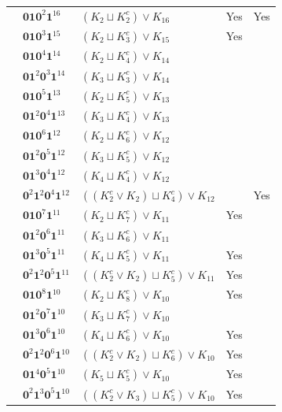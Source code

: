 \documentclass[preprint]{elsarticle}
\begin{document}
\begin{center}
\begin{longtable}{p{0.7cm} p{2cm} p{4cm} p{1cm} p{0cm}}
&$\mathbf{0} \mathbf{1} \mathbf{0}^2 \mathbf{1}^{16}$ & $ (K_{2} \sqcup K_{2}^c) \vee K_{16}$ &Yes &Yes\\
&$\mathbf{0} \mathbf{1} \mathbf{0}^3 \mathbf{1}^{15}$ & $ (K_{2} \sqcup K_{3}^c) \vee K_{15}$ &Yes &\\
&$\mathbf{0} \mathbf{1} \mathbf{0}^4 \mathbf{1}^{14}$ & $ (K_{2} \sqcup K_{4}^c) \vee K_{14}$ & &\\
&$\mathbf{0} \mathbf{1}^{2} \mathbf{0}^3 \mathbf{1}^{14}$ & $ (K_{3} \sqcup K_{3}^c) \vee K_{14}$ & &\\
&$\mathbf{0} \mathbf{1} \mathbf{0}^5 \mathbf{1}^{13}$ & $ (K_{2} \sqcup K_{5}^c) \vee K_{13}$ & &\\
&$\mathbf{0} \mathbf{1}^{2} \mathbf{0}^4 \mathbf{1}^{13}$ & $ (K_{3} \sqcup K_{4}^c) \vee K_{13}$ & &\\
&$\mathbf{0} \mathbf{1} \mathbf{0}^6 \mathbf{1}^{12}$ & $ (K_{2} \sqcup K_{6}^c) \vee K_{12}$ & &\\
&$\mathbf{0} \mathbf{1}^{2} \mathbf{0}^5 \mathbf{1}^{12}$ & $ (K_{3} \sqcup K_{5}^c) \vee K_{12}$ & &\\
&$\mathbf{0} \mathbf{1}^{3} \mathbf{0}^4 \mathbf{1}^{12}$ & $ (K_{4} \sqcup K_{4}^c) \vee K_{12}$ & &\\
&$\mathbf{0}^{2} \mathbf{1}^{2} \mathbf{0}^4 \mathbf{1}^{12}$ & $((K_{2}^c \vee K_{2}) \sqcup K_{4}^c) \vee K_{12}$ & &Yes\\
&$\mathbf{0} \mathbf{1} \mathbf{0}^7 \mathbf{1}^{11}$ & $(K_{2} \sqcup K_{7}^c) \vee K_{11}$ &Yes &\\
&$\mathbf{0} \mathbf{1}^{2} \mathbf{0}^6 \mathbf{1}^{11}$ & $(K_{3} \sqcup K_{6}^c) \vee K_{11}$ & &\\
&$\mathbf{0} \mathbf{1}^{3} \mathbf{0}^5 \mathbf{1}^{11}$ & $(K_{4} \sqcup K_{5}^c) \vee K_{11}$ &Yes &\\
&$\mathbf{0}^{2} \mathbf{1}^{2} \mathbf{0}^5 \mathbf{1}^{11}$ & $((K_{2}^{c} \vee K_{2}) \sqcup K_{5}^{c}) \vee K_{11}$ &Yes  &\\
&$\mathbf{0} \mathbf{1} \mathbf{0}^8 \mathbf{1}^{10}$ & $(K_{2} \sqcup K_{8}^{c}) \vee K_{10}$ &Yes  &\\
&$\mathbf{0} \mathbf{1}^{2} \mathbf{0}^7 \mathbf{1}^{10}$ & $(K_{3} \sqcup K_{7}^{c}) \vee K_{10}$ &  &\\
&$\mathbf{0} \mathbf{1}^{3} \mathbf{0}^6 \mathbf{1}^{10}$ & $(K_{4} \sqcup K_{6}^{c}) \vee K_{10}$ & Yes &\\
&$\mathbf{0}^{2} \mathbf{1}^{2} \mathbf{0}^6 \mathbf{1}^{10}$ & $((K_{2}^{c} \vee K_{2}) \sqcup  K_{6}^{c}) \vee K_{10}$ & Yes &\\
&$\mathbf{0} \mathbf{1}^{4} \mathbf{0}^5 \mathbf{1}^{10}$ & $ (K_{5} \sqcup K_{5}^c) \vee K_{10}$ &Yes  &\\
&$\mathbf{0}^{2} \mathbf{1}^{3} \mathbf{0}^5 \mathbf{1}^{10}$ & $((K_{2}^{c} \vee K_{3}) \sqcup  K_{5}^{c}) \vee K_{10}$ & Yes &\\
\hline






\end{longtable}
\end{center}
\end{document}
